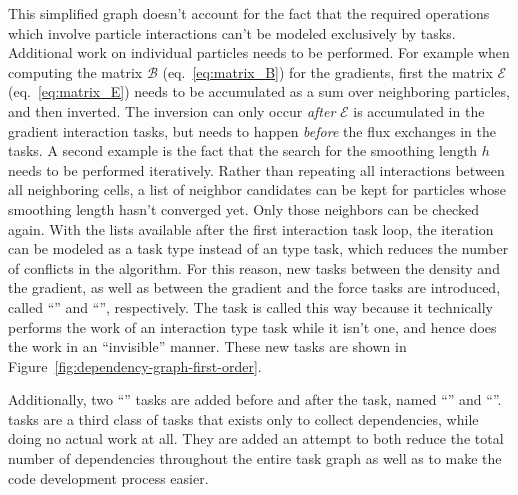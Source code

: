 This simplified graph doesn't account for the fact that the required operations which involve
particle interactions can't be modeled exclusively by  tasks. Additional work on
individual particles needs to be performed. For example when computing the matrix $\mathcal{B}$
(eq.~\ref{eq:matrix_B}) for the gradients, first the matrix $\mathcal{E}$ (eq.~\ref{eq:matrix_E})
needs to be accumulated as a sum over neighboring particles, and then inverted. The inversion can
only occur \emph{after} $\mathcal{E}$ is accumulated in the gradient interaction tasks, but needs to
happen \emph{before} the flux exchanges in the  tasks. A second example is the fact
that the search for the smoothing length $h$ needs to be performed iteratively. Rather than
repeating all interactions between all neighboring cells, a list of neighbor candidates can be kept
for particles whose smoothing length hasn't converged yet. Only those neighbors can be checked
again. With the lists available after the first interaction task loop, the iteration can be modeled
as a  task type instead of an  type task, which reduces the number
of conflicts in the algorithm. For this reason, new tasks between the density and the gradient, as
well as between the gradient and the force tasks are introduced, called ``'' and
``'', respectively. The  task is called this way because it
technically performs the work of an interaction type task while it isn't one, and hence does the
work in an ``invisible'' manner. These new tasks are shown in
Figure~\ref{fig:dependency-graph-first-order}.

Additionally, two ``'' tasks are added before and after the  task,
named ``'' and ``''.  tasks are a third class
of tasks that exists only to collect dependencies, while doing no actual work at all. They are added
an attempt to both reduce the total number of dependencies throughout the entire task graph as well
as to make the code development process easier.



